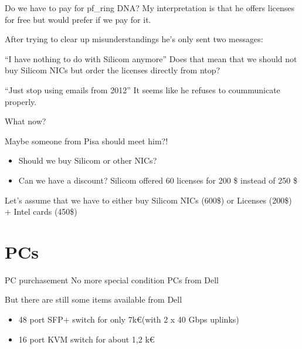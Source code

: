 \begin{frame}{Do we have to pay for pf_ring DNA?}{}
	My interpretation is that he offers licenses for free but would prefer if we
	pay for it.
	
	After trying to clear up misunderstandings he's only sent two messages:
	
	\begin{block}{``I have nothing to do with Silicom anymore''}
			Does that mean that we should not buy Silicom NICs but order the licenses
			directly from ntop?
	\end{block}
	
	\begin{block}{``Just stop using emails from 2012''}
		It seems like he refuses to	coummunicate properly. 
	\end{block}

\end{frame}

\begin{frame}{What now?}{}
	
	\begin{block}{Maybe someone from Pisa should meet him?!}
			\begin{itemize}
				\item Should we buy Silicom or other NICs?
				\item Can we have a discount? Silicom offered 60 licenses for 200 \$ instead
				of 250 \$
			\end{itemize}
	\end{block}
	
	\begin{ergo}
		Let's assume that we have to either buy Silicom NICs (600\$) or Licenses
		(200\$) + Intel cards (450\$)
\end{ergo}
\end{frame}


\section*{PCs}

\begin{frame}{PC purchasement}{}
	No more special condition PCs from Dell
	\begin{block}{But there are still some items available from Dell}
		\begin{itemize}
		  	\item 48 port SFP+ switch for only 7k\euro (with 2 x 40 Gbps uplinks) 			  	
  			\item 16 port KVM switch for about 1,2 k\euro
		\end{itemize}	
	\end{block}
	
\end{frame}


